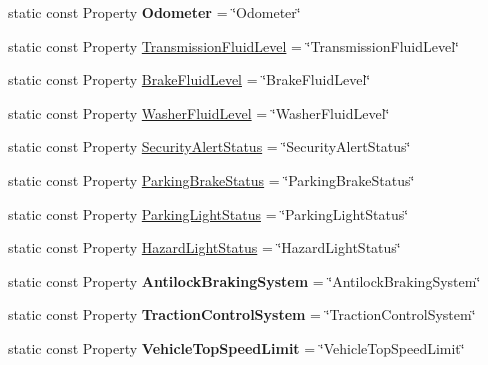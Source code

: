 \begin{DoxyCompactItemize}
\item 
\hypertarget{classVehicleProperty_ad97147489a5be3babe1bb94dbb2cf970}{static const Property {\bfseries Odometer} = \char`\"{}Odometer\char`\"{}}\label{classVehicleProperty_ad97147489a5be3babe1bb94dbb2cf970}

\item 
static const Property \hyperlink{classVehicleProperty_a288aa5c2be698825142da9d87c13c447}{Transmission\-Fluid\-Level} = \char`\"{}Transmission\-Fluid\-Level\char`\"{}
\item 
static const Property \hyperlink{classVehicleProperty_a83bc635222e9ba14dfa134defa21e825}{Brake\-Fluid\-Level} = \char`\"{}Brake\-Fluid\-Level\char`\"{}
\item 
static const Property \hyperlink{classVehicleProperty_a37c8c7e827625705d2f560ab53ee8d23}{Washer\-Fluid\-Level} = \char`\"{}Washer\-Fluid\-Level\char`\"{}
\item 
static const Property \hyperlink{classVehicleProperty_a7bc28af663879a2ac9145e5b97a5da4f}{Security\-Alert\-Status} = \char`\"{}Security\-Alert\-Status\char`\"{}
\item 
static const Property \hyperlink{classVehicleProperty_a848ad7334c7aa14709fe2e8c3a1b2608}{Parking\-Brake\-Status} = \char`\"{}Parking\-Brake\-Status\char`\"{}
\item 
static const Property \hyperlink{classVehicleProperty_a505ffc37974f674df55a97c27a7ba0b7}{Parking\-Light\-Status} = \char`\"{}Parking\-Light\-Status\char`\"{}
\item 
static const Property \hyperlink{classVehicleProperty_a21058071101327c72251e2e09e24cb67}{Hazard\-Light\-Status} = \char`\"{}Hazard\-Light\-Status\char`\"{}
\item 
\hypertarget{classVehicleProperty_ab3ed7359914eb1aad8aff1a3409b1f0c}{static const Property {\bfseries Antilock\-Braking\-System} = \char`\"{}Antilock\-Braking\-System\char`\"{}}\label{classVehicleProperty_ab3ed7359914eb1aad8aff1a3409b1f0c}

\item 
\hypertarget{classVehicleProperty_a16b20920ac636662cc4accacde1a434f}{static const Property {\bfseries Traction\-Control\-System} = \char`\"{}Traction\-Control\-System\char`\"{}}\label{classVehicleProperty_a16b20920ac636662cc4accacde1a434f}

\item 
\hypertarget{classVehicleProperty_aa33a83620bfe2ece493a8e8e7e1fdbcc}{static const Property {\bfseries Vehicle\-Top\-Speed\-Limit} = \char`\"{}Vehicle\-Top\-Speed\-Limit\char`\"{}}\label{classVehicleProperty_aa33a83620bfe2ece493a8e8e7e1fdbcc}


\end{DoxyCompactItemize}
